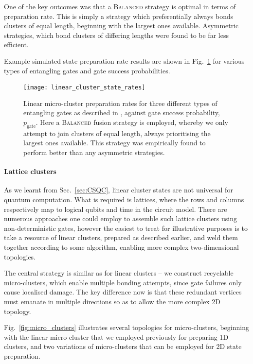 One of the key outcomes was that a \textsc{Balanced} strategy is optimal in terms of preparation rate. This is simply a strategy which preferentially always bonds clusters of equal length, beginning with the largest ones available. Asymmetric strategies, which bond clusters of differing lengths were found to be far less efficient.

Example simulated state preparation rate results are shown in Fig.~\ref{fig:linear_cluster_state_r} for various types of entangling gates and gate success probabilities.

\begin{figure}[htpb]
\texttt{[image: linear\_cluster\_state\_rates]}
\caption{Linear micro-cluster preparation rates for three different types of entangling gates as described in \cite{bib:RohdeBarrett07}, against gate success probability, $p_\mathrm{gate}$. Here a \textsc{Balanced} fusion strategy is employed, whereby we only attempt to join clusters of equal length, always prioritising the largest ones available. This strategy was empirically found to perform better than any asymmetric strategies.}\label{fig:linear_cluster_state_r}
\end{figure}

%
%

\paragraph{Lattice clusters}

As we learnt from Sec.~\ref{sec:CSQC}, linear cluster states are not universal for quantum computation. What is required is lattices, where the rows and columns respectively map to logical qubits and time in the circuit model. There are numerous approaches one could employ to assemble such lattice clusters using non-deterministic gates, however the easiest to treat for illustrative purposes is to take a resource of linear clusters, prepared as described earlier, and weld them together according to some algorithm, enabling more complex two-dimensional topologies.

The central strategy is similar as for linear clusters -- we construct recyclable micro-clusters, which enable multiple bonding attempts, since gate failures only cause localised damage. The key difference now is that these redundant vertices must emanate in multiple directions so as to allow the more complex 2D topology.

Fig.~\ref{fig:micro_clusters} illustrates several topologies for micro-clusters, beginning with the linear micro-cluster that we employed previously for preparing 1D clusters, and two variations of micro-clusters that can be employed for 2D state preparation.

